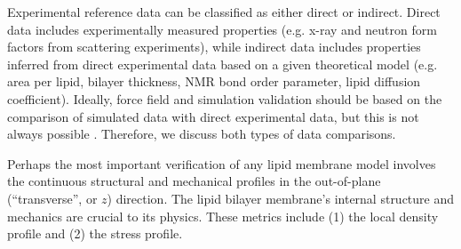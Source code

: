 \documentclass[9pt,bestpractices]{livecoms}
\begin{document}
Experimental reference data can be classified as either direct or indirect.
Direct data includes experimentally measured properties (e.g. x-ray and neutron form factors from scattering experiments), while indirect data includes properties inferred from direct experimental data based on a given theoretical model (e.g. area per lipid, bilayer thickness, NMR bond order parameter, lipid diffusion coefficient).
Ideally, force field and simulation validation should be based on the comparison of simulated data with direct experimental data, but this is not always possible \cite{Poger2016}.
Therefore, we discuss both types of data comparisons.

Perhaps the most important verification of any lipid membrane model involves the continuous structural and mechanical profiles in the out-of-plane (``transverse'', or $z$) direction. The lipid bilayer membrane's internal structure and mechanics are crucial to its physics. These metrics include (1) the local density profile and (2) the stress profile.
\end{document}
